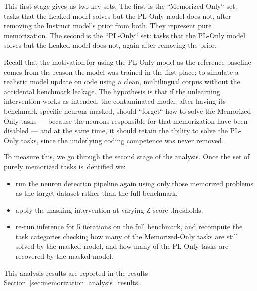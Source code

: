 \documentclass[mscthesis]{usiinfthesis}
\begin{document}
This first stage gives us two key sets.
The first is the ``Memorized-Only`` set: tasks that the Leaked model solves but the PL-Only model does not, after removing the Instruct model's prior from both. 
They represent pure memorization. 
The second is the ``PL-Only`` set: tasks that the PL-Only model solves but the Leaked model does not, again after removing the prior. 
\par\vspace{1em}
Recall that the motivation for using the PL-Only model as the reference baseline comes from the reason the model was trained in the first place: to simulate a realistic model update on code using a clean, multilingual corpus without the accidental benchmark leakage.
The hypothesis is that if the unlearning intervention works as intended, the contaminated model, after having its benchmark-specific neurons masked, should ``forget`` how to solve the Memorized-Only tasks --- because the neurons responsible for that memorization have been disabled --- and at the same time, it should retain the ability to solve the PL-Only tasks, since the underlying coding competence was never removed.
\par\vspace{1em}
To measure this, we go through the second stage of the analysis.
Once the set of purely memorized tasks is identified we:
\begin{itemize}
	\item run the neuron detection pipeline again using only those memorized problems as the target dataset rather than the full benchmark.
	\item apply the masking intervention at varying Z-score thresholds.
	\item  re-run inference for 5 iterations on the full benchmark, and recompute the task categories checking how many of the Memorized-Only tasks are still solved by the masked model, and how many of the PL-Only tasks are recovered by the masked model.
\end{itemize} 
This analysis results are reported in the results Section~\ref{sec:memorization_analysis_results}.
\end{document}

